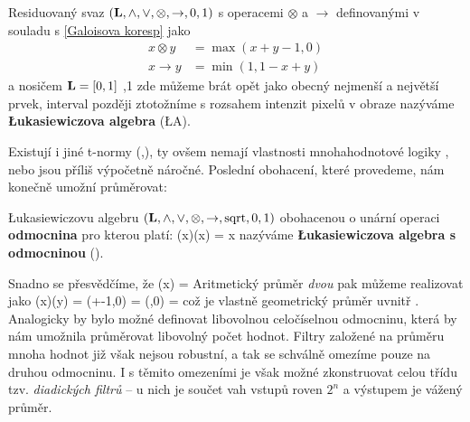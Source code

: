     \begin{define}\label{LA}
    Residuovaný svaz $(\mathbf{L},\wedge,\vee,\otimes,\rightarrow,0,1)$ s operacemi $\otimes$ a $\rightarrow$ definovanými v souladu s \eqref{Galoisova koresp} jako
    \begin{align}
    x \otimes y &= \max(x+y-1,0) \\
    x \rightarrow y &= \min(1,1-x+y)
    \end{align}
    a nosičem $\mathbf{L} = [0,1]$ ,1 zde můžeme brát opět jako obecný nejmenší a největší prvek, interval později ztotožníme s rozsahem intenzit pixelů v obraze\rr {} nazýváme \textbf{\L ukasiewiczova algebra} \textup{(\L A)}.
    \end{define}


    Existují i jiné t-normy (\cite{MajerovaPhD},\cite{Bělíček}), ty ovšem nemají vlastnosti mnohahodnotové logiky \cite{MajerovaPhD}, nebo jsou příliš výpočetně náročné. Poslední obohacení, které provedeme, nám konečně umožní průměrovat:

    \begin{define}\label{LAsqrt}
    \L ukasiewiczovu algebru $(\mathbf{L},\wedge,\vee,\otimes,\rightarrow,\mathrm{sqrt},0,1)$ obohacenou o unární operaci \textbf{odmocnina} pro kterou platí:
    \beq
    \sqr(x)\otimes\sqr(x) = x
    \eeq
    nazýváme \textbf{\L ukasiewiczova algebra s odmocninou} \textup{(\LAsq)}.
    \end{define}

    Snadno se přesvědčíme, že
    \beq
    \sqr(x) = 
    \eeq
    Aritmetický průměr \emph{dvou} pak můžeme realizovat jako
    \beq
    \sqr(x)\otimes \sqr(y) = \max\left(+-1,0\right) = \max\left(,0\right) = 
    \eeq
    což je vlastně geometrický průměr uvnitř \LAsq. Analogicky by bylo možné definovat libovolnou celočíselnou odmocninu, která by nám umožnila průměrovat libovolný počet hodnot. Filtry založené na průměru mnoha hodnot již však nejsou robustní, a tak se schválně omezíme pouze na druhou odmocninu. I s těmito omezeními je však možné zkonstruovat celou třídu tzv. \emph{diadických filtrů} -- u nich je součet vah vstupů roven $2^n$ a výstupem je vážený průměr. 

